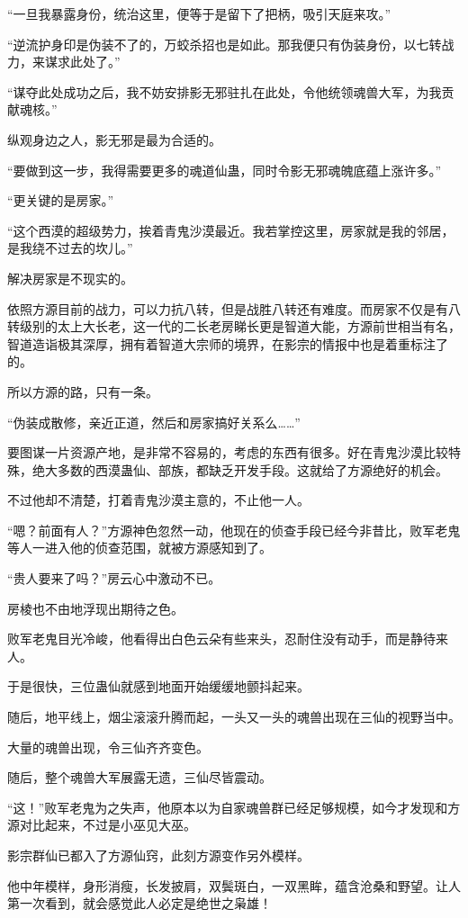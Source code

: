 \begin{this_body}
“一旦我暴露身份，统治这里，便等于是留下了把柄，吸引天庭来攻。”

“逆流护身印是伪装不了的，万蛟杀招也是如此。那我便只有伪装身份，以七转战力，来谋求此处了。”

“谋夺此处成功之后，我不妨安排影无邪驻扎在此处，令他统领魂兽大军，为我贡献魂核。”

纵观身边之人，影无邪是最为合适的。

“要做到这一步，我得需要更多的魂道仙蛊，同时令影无邪魂魄底蕴上涨许多。”

“更关键的是房家。”

“这个西漠的超级势力，挨着青鬼沙漠最近。我若掌控这里，房家就是我的邻居，是我绕不过去的坎儿。”

解决房家是不现实的。

依照方源目前的战力，可以力抗八转，但是战胜八转还有难度。而房家不仅是有八转级别的太上大长老，这一代的二长老房睇长更是智道大能，方源前世相当有名，智道造诣极其深厚，拥有着智道大宗师的境界，在影宗的情报中也是着重标注了的。

所以方源的路，只有一条。

“伪装成散修，亲近正道，然后和房家搞好关系么……”

要图谋一片资源产地，是非常不容易的，考虑的东西有很多。好在青鬼沙漠比较特殊，绝大多数的西漠蛊仙、部族，都缺乏开发手段。这就给了方源绝好的机会。

不过他却不清楚，打着青鬼沙漠主意的，不止他一人。

“嗯？前面有人？”方源神色忽然一动，他现在的侦查手段已经今非昔比，败军老鬼等人一进入他的侦查范围，就被方源感知到了。

“贵人要来了吗？”房云心中激动不已。

房棱也不由地浮现出期待之色。

败军老鬼目光冷峻，他看得出白色云朵有些来头，忍耐住没有动手，而是静待来人。

于是很快，三位蛊仙就感到地面开始缓缓地颤抖起来。

随后，地平线上，烟尘滚滚升腾而起，一头又一头的魂兽出现在三仙的视野当中。

大量的魂兽出现，令三仙齐齐变色。

随后，整个魂兽大军展露无遗，三仙尽皆震动。

“这！”败军老鬼为之失声，他原本以为自家魂兽群已经足够规模，如今才发现和方源对比起来，不过是小巫见大巫。

影宗群仙已都入了方源仙窍，此刻方源变作另外模样。

他中年模样，身形消瘦，长发披肩，双鬓斑白，一双黑眸，蕴含沧桑和野望。让人第一次看到，就会感觉此人必定是绝世之枭雄！


\end{this_body}

